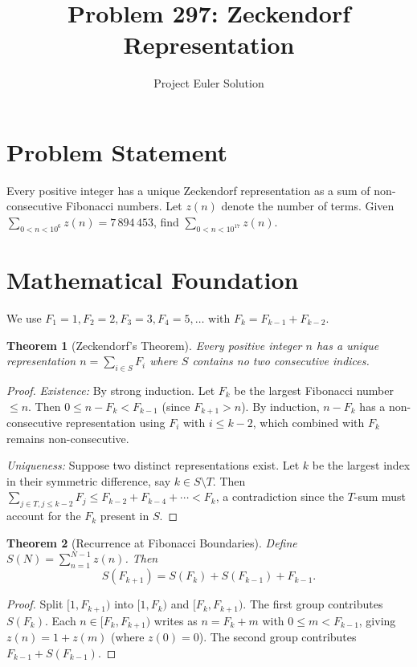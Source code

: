\documentclass[12pt]{article}
\title{Problem 297: Zeckendorf Representation}
\author{Project Euler Solution}
\date{}
\newtheorem{theorem}{Theorem}
\begin{document}
\maketitle

\section{Problem Statement}
Every positive integer has a unique Zeckendorf representation as a sum of non-consecutive Fibonacci numbers. Let $z(n)$ denote the number of terms. Given $\sum_{0 < n < 10^6} z(n) = 7\,894\,453$, find $\sum_{0 < n < 10^{17}} z(n)$.

\section{Mathematical Foundation}

We use $F_1 = 1, F_2 = 2, F_3 = 3, F_4 = 5, \ldots$ with $F_k = F_{k-1} + F_{k-2}$.

\begin{theorem}[Zeckendorf's Theorem]
Every positive integer $n$ has a unique representation $n = \sum_{i \in S} F_i$ where $S$ contains no two consecutive indices.
\end{theorem}

\begin{proof}
\emph{Existence:} By strong induction. Let $F_k$ be the largest Fibonacci number $\leq n$. Then $0 \leq n - F_k < F_{k-1}$ (since $F_{k+1} > n$). By induction, $n - F_k$ has a non-consecutive representation using $F_i$ with $i \leq k-2$, which combined with $F_k$ remains non-consecutive.

\emph{Uniqueness:} Suppose two distinct representations exist. Let $k$ be the largest index in their symmetric difference, say $k \in S \setminus T$. Then $\sum_{j \in T, j \leq k-2} F_j \leq F_{k-2} + F_{k-4} + \cdots < F_k$, a contradiction since the $T$-sum must account for the $F_k$ present in $S$.
\end{proof}

\begin{theorem}[Recurrence at Fibonacci Boundaries]
Define $S(N) = \sum_{n=1}^{N-1} z(n)$. Then
\[
S(F_{k+1}) = S(F_k) + S(F_{k-1}) + F_{k-1}.
\]
\end{theorem}

\begin{proof}
Split $[1, F_{k+1})$ into $[1, F_k)$ and $[F_k, F_{k+1})$. The first group contributes $S(F_k)$. Each $n \in [F_k, F_{k+1})$ writes as $n = F_k + m$ with $0 \leq m < F_{k-1}$, giving $z(n) = 1 + z(m)$ (where $z(0) = 0$). The second group contributes $F_{k-1} + S(F_{k-1})$.
\end{proof}
\end{document}
